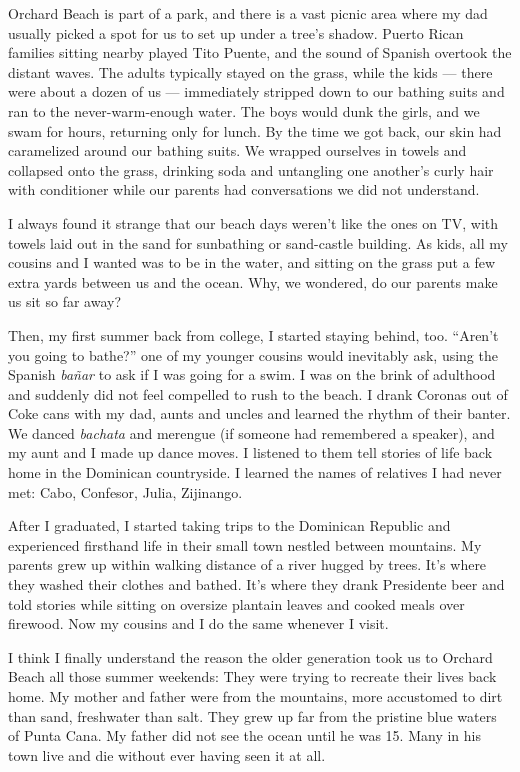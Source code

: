 Orchard Beach is part of a park, and there is a vast picnic area where
my dad usually picked a spot for us to set up under a tree's shadow.
Puerto Rican families sitting nearby played Tito Puente, and the sound
of Spanish overtook the distant waves. The adults typically stayed on
the grass, while the kids --- there were about a dozen of us ---
immediately stripped down to our bathing suits and ran to the
never-warm-enough water. The boys would dunk the girls, and we swam for
hours, returning only for lunch. By the time we got back, our skin had
caramelized around our bathing suits. We wrapped ourselves in towels and
collapsed onto the grass, drinking soda and untangling one another's
curly hair with conditioner while our parents had conversations we did
not understand.

I always found it strange that our beach days weren't like the ones on
TV, with towels laid out in the sand for sunbathing or sand-castle
building. As kids, all my cousins and I wanted was to be in the water,
and sitting on the grass put a few extra yards between us and the ocean.
Why, we wondered, do our parents make us sit so far away?

Then, my first summer back from college, I started staying behind, too.
``Aren't you going to bathe?'' one of my younger cousins would
inevitably ask, using the Spanish \emph{bañar} to ask if I was going for
a swim. I was on the brink of adulthood and suddenly did not feel
compelled to rush to the beach. I drank Coronas out of Coke cans with my
dad, aunts and uncles and learned the rhythm of their banter. We danced
\emph{bachata} and merengue (if someone had remembered a speaker), and
my aunt and I made up dance moves. I listened to them tell stories of
life back home in the Dominican countryside. I learned the names of
relatives I had never met: Cabo, Confesor, Julia, Zijinango.

After I graduated, I started taking trips to the Dominican Republic and
experienced firsthand life in their small town nestled between
mountains. My parents grew up within walking distance of a river hugged
by trees. It's where they washed their clothes and bathed. It's where
they drank Presidente beer and told stories while sitting on oversize
plantain leaves and cooked meals over firewood. Now my cousins and I do
the same whenever I visit.

I think I finally understand the reason the older generation took us to
Orchard Beach all those summer weekends: They were trying to recreate
their lives back home. My mother and father were from the mountains,
more accustomed to dirt than sand, freshwater than salt. They grew up
far from the pristine blue waters of Punta Cana. My father did not see
the ocean until he was 15. Many in his town live and die without ever
having seen it at all.

